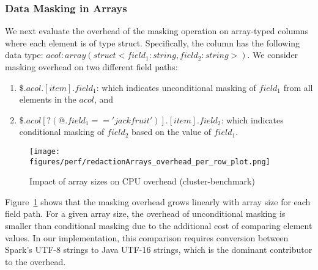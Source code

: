 \subsubsection{Data Masking in Arrays} 
We next evaluate the overhead of the masking operation 
on array-typed columns where each element is of type struct. Specifically, the column has the following data type: 
$acol : array(struct<field_1:string, field_2:string>)$. We consider masking overhead on two different field paths: 
\begin{enumerate}
\item $\$.acol.[item].field_1$: which indicates unconditional masking of $field_1$ from all elements in the $acol$, and 
\item $\$.acol[?(@.field_1 == 'jackfruit')].[item].field_2$: which indicates conditional masking of $field_2$ based on the value of $field_1$. 
\end{enumerate}
\begin{figure}[ht]  %
    \vspace{-1em}
    \texttt{[image: figures/perf/redactionArrays\_overhead\_per\_row\_plot.png]}
    \vspace{-1em}
    \caption{Impact of array sizes on CPU overhead (cluster-benchmark)}  %
    \vspace{-2em}
    \label{fig:PerArrayPrimSec}  %
\end{figure}
Figure~\ref{fig:PerArrayPrimSec} shows that the masking overhead grows linearly with array size for each field path.
For a given array size, the overhead of unconditional masking is smaller than
conditional masking due to the additional cost of comparing element values. In our implementation, this comparison requires conversion between Spark's UTF-8 strings to
Java UTF-16 strings, which is the dominant contributor to the overhead. \\


